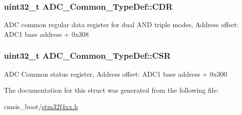 \subsubsection[{\texorpdfstring{C\+DR}{CDR}}]{ uint32\+\_\+t A\+D\+C\+\_\+\+Common\+\_\+\+Type\+Def\+::\+C\+DR}\hypertarget{struct_a_d_c___common___type_def_a6f7399bf70f677ef5de46a3038f414e1}{}\label{struct_a_d_c___common___type_def_a6f7399bf70f677ef5de46a3038f414e1}
A\+DC common regular data register for dual A\+ND triple modes, Address offset\+: A\+D\+C1 base address + 0x308 
\subsubsection[{\texorpdfstring{C\+SR}{CSR}}]{ uint32\+\_\+t A\+D\+C\+\_\+\+Common\+\_\+\+Type\+Def\+::\+C\+SR}\hypertarget{struct_a_d_c___common___type_def_ac38e24f600f9e134a54a0c43b976a4f4}{}\label{struct_a_d_c___common___type_def_ac38e24f600f9e134a54a0c43b976a4f4}
A\+DC Common status register, Address offset\+: A\+D\+C1 base address + 0x300 

The documentation for this struct was generated from the following file\+:\begin{DoxyCompactItemize}
\item 
cmsis\+\_\+boot/\hyperlink{stm32f4xx_8h}{stm32f4xx.\+h}\end{DoxyCompactItemize}
